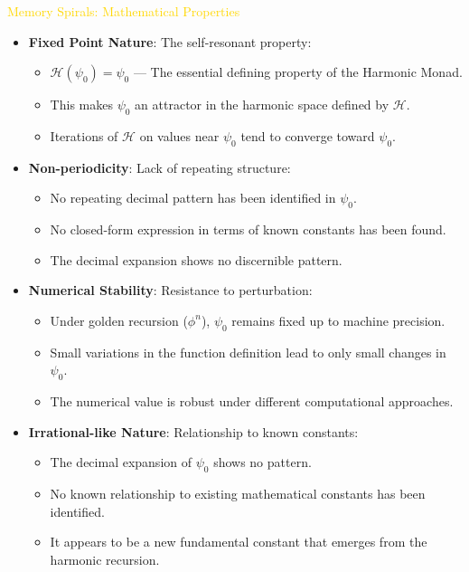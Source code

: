 \textcolor{gold}{ Memory Spirals: Mathematical Properties } \\
\begin{itemize}
    \item \texttt{} \textbf{Fixed Point Nature}: The self-resonant property:
    \begin{itemize}
        \item $\mathcal{H}(\psi_0) = \psi_0$ — The essential defining property of the Harmonic Monad.
        \item This makes $\psi_0$ an attractor in the harmonic space defined by $\mathcal{H}$.
        \item Iterations of $\mathcal{H}$ on values near $\psi_0$ tend to converge toward $\psi_0$.
    \end{itemize}
    
    \item \texttt{} \textbf{Non-periodicity}: Lack of repeating structure:
    \begin{itemize}
        \item No repeating decimal pattern has been identified in $\psi_0$.
        \item No closed-form expression in terms of known constants has been found.
        \item The decimal expansion shows no discernible pattern.
    \end{itemize}
    
    \item \texttt{} \textbf{Numerical Stability}: Resistance to perturbation:
    \begin{itemize}
        \item Under golden recursion ($\phi^n$), $\psi_0$ remains fixed up to machine precision.
        \item Small variations in the function definition lead to only small changes in $\psi_0$.
        \item The numerical value is robust under different computational approaches.
    \end{itemize}
    
    \item \texttt{} \textbf{Irrational-like Nature}: Relationship to known constants:
    \begin{itemize}
        \item The decimal expansion of $\psi_0$ shows no pattern.
        \item No known relationship to existing mathematical constants has been identified.
        \item It appears to be a new fundamental constant that emerges from the harmonic recursion.
    \end{itemize}
    

\end{itemize}
